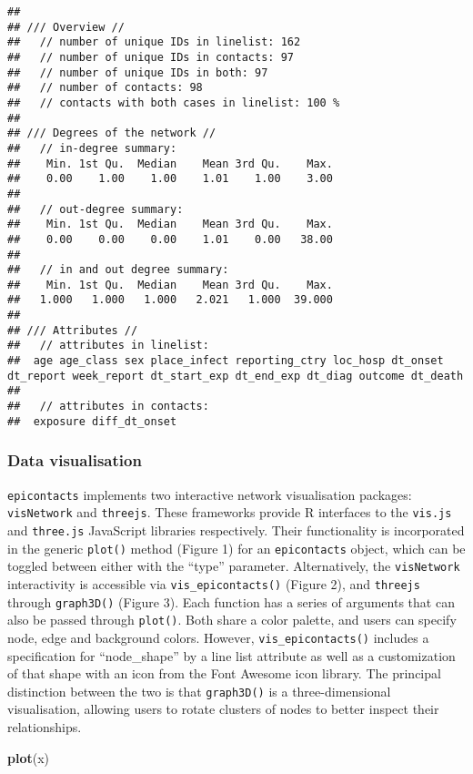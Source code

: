 \documentclass[9pt,a4paper,]{extarticle}
\newenvironment{Shaded}{\begin{snugshade}}{\end{snugshade}}
\newcommand{\KeywordTok}[1]{\textcolor[rgb]{0.13,0.29,0.53}{\textbf{#1}}}
\newcommand{\NormalTok}[1]{#1}
\theoremstyle{definition}
\theoremstyle{definition}
\theoremstyle{definition}
\theoremstyle{remark}
\begin{document}
\begin{verbatim}
## 
## /// Overview //
##   // number of unique IDs in linelist: 162
##   // number of unique IDs in contacts: 97
##   // number of unique IDs in both: 97
##   // number of contacts: 98
##   // contacts with both cases in linelist: 100 %
## 
## /// Degrees of the network //
##   // in-degree summary:
##    Min. 1st Qu.  Median    Mean 3rd Qu.    Max. 
##    0.00    1.00    1.00    1.01    1.00    3.00 
## 
##   // out-degree summary:
##    Min. 1st Qu.  Median    Mean 3rd Qu.    Max. 
##    0.00    0.00    0.00    1.01    0.00   38.00 
## 
##   // in and out degree summary:
##    Min. 1st Qu.  Median    Mean 3rd Qu.    Max. 
##   1.000   1.000   1.000   2.021   1.000  39.000 
## 
## /// Attributes //
##   // attributes in linelist:
##  age age_class sex place_infect reporting_ctry loc_hosp dt_onset dt_report week_report dt_start_exp dt_end_exp dt_diag outcome dt_death
## 
##   // attributes in contacts:
##  exposure diff_dt_onset
\end{verbatim}

\subsubsection{Data visualisation}\label{data-visualisation}

\texttt{epicontacts} implements two interactive network visualisation packages: \texttt{visNetwork} and \texttt{threejs}\citep{visNetwork}\citep{threejs}. These frameworks provide R interfaces to the \texttt{vis.js} and \texttt{three.js} JavaScript libraries respectively. Their functionality is incorporated in the generic \texttt{plot()} method (Figure 1) for an \texttt{epicontacts} object, which can be toggled between either with the ``type'' parameter. Alternatively, the \texttt{visNetwork} interactivity is accessible via \texttt{vis\_epicontacts()} (Figure 2), and \texttt{threejs} through \texttt{graph3D()} (Figure 3). Each function has a series of arguments that can also be passed through \texttt{plot()}. Both share a color palette, and users can specify node, edge and background colors. However, \texttt{vis\_epicontacts()} includes a specification for ``node\_shape'' by a line list attribute as well as a customization of that shape with an icon from the Font Awesome icon library. The principal distinction between the two is that \texttt{graph3D()} is a three-dimensional visualisation, allowing users to rotate clusters of nodes to better inspect their relationships.

\begin{Shaded}
\begin{Highlighting}[]
\KeywordTok{plot}\NormalTok{(x)}
\end{Highlighting}
\end{Shaded}
\end{document}
